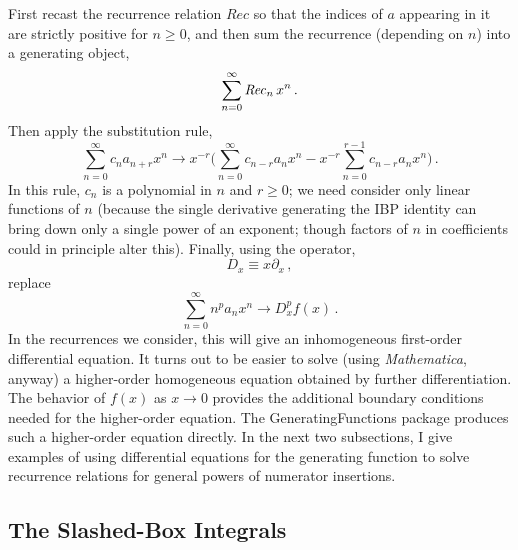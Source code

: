 \documentclass[aps,prd,preprint,groupedaddress,nofootinbib,showpacs,eqsecnum]{revtex4}
\begin{document}
First recast the recurrence relation $\textit{Rec}$ so that the indices 
of $a$ appearing in it
are strictly positive for $n\ge 0$, 
and then sum the recurrence (depending on $n$)
into a generating object,
\begin{equation}
\sum_{n=0}^\infty \textit{Rec\/}_n\, x^n\,.
\end{equation}
Then apply the substitution rule,
\begin{equation}
\sum_{n=0}^\infty c_n a_{n+r} x^n \rightarrow
x^{-r}\biggl( \sum_{n=0}^\infty c_{n-r} a_{n} x^n
-x^{-r} \sum_{n=0}^{r-1} c_{n-r} a_{n} x^n
\biggr)\,.
\end{equation}
In this rule, $c_n$ is a polynomial in $n$ and $r\ge 0$; we need consider only
linear functions of $n$ (because the single derivative generating the
IBP identity can bring down only a single power of an exponent; though
factors of $n$ in coefficients could in principle alter this).
Finally, using the operator,
\begin{equation}
D_x \equiv x\partial_x\,,
\end{equation}
replace
\begin{equation}
\sum_{n=0}^\infty n^p a_n x^n \rightarrow D_x^p f(x)\,.
\end{equation}
In the recurrences we consider, this will give an inhomogeneous 
first-order differential equation.  It turns out to be easier
to solve (using \textsl{Mathematica\/}, anyway) 
a higher-order homogeneous equation obtained by further differentiation.
The behavior of $f(x)$ as $x\rightarrow 0$ provides the additional 
boundary conditions needed for the higher-order equation.  The 
\textsf{GeneratingFunctions} package produces such a higher-order
equation directly.  In the next two subsections, I give examples
of using differential equations for the generating function to 
solve recurrence relations for general powers of numerator insertions.

\subsection{The Slashed-Box Integrals}
\end{document}
